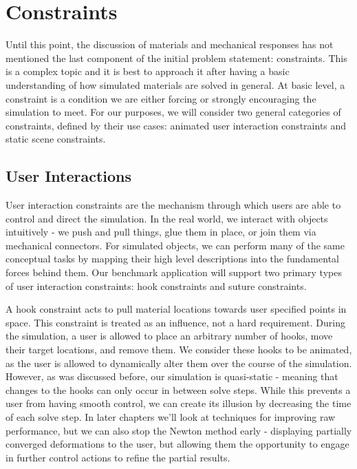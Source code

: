   \section{Constraints}

  Until this point, the discussion of materials and mechanical
  responses has not mentioned the last component of the initial
  problem statement: constraints. This is a complex
  topic and it is best to approach it after having a basic
  understanding of how simulated materials are solved in general. At
  basic level, a constraint is a condition we are either forcing or
  strongly encouraging the simulation to meet. For our purposes, we
  will consider two general categories of constraints, defined by
  their use cases: animated user interaction constraints and static
  scene constraints. 

  \subsection{User Interactions}
  
  User interaction constraints are the mechanism through which users
  are able to control and direct the simulation. In the real world, we
  interact with objects intuitively - we push and pull things, glue
  them in place, or join them via mechanical connectors. For simulated
  objects, we can perform many of the same conceptual tasks by mapping
  their high level descriptions into the fundamental forces behind
  them. Our benchmark application will support two primary types of user
  interaction constraints: hook constraints and suture constraints.  

  A hook constraint acts to pull material locations towards user
  specified points in space. This constraint is treated as an
  influence, not a hard requirement. During the simulation, a user is allowed
  to place an arbitrary number of hooks, move their target locations,
  and remove them. We consider these hooks to be animated, as the user
  is allowed to dynamically alter them over the course of the
  simulation. However, as was discussed before, our simulation is
  quasi-static - meaning that changes to the hooks can only occur
  in between solve steps. While this prevents a user from having
  smooth control, we can create its illusion by decreasing the time of
  each solve step. In later chapters we'll look at techniques for
  improving raw performance, but we can also stop the Newton method
  early - displaying partially converged deformations to the user, but
  allowing them the opportunity to engage in further control actions
  to refine the partial results.


